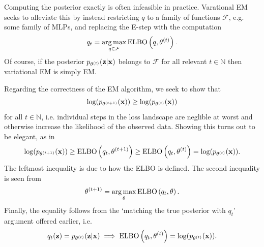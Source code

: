 \documentclass[11pt]{article}
\begin{document}
\begin{appendices}
\begin{tcolorbox}[title={\centering\textbf{Variational EM}}, colback=myLightBlue, colbacktitle=myDarkBlue, colframe=myDarkBlue, coltitle=white]
    Computing the posterior exactly is often infeasible in practice. Varational EM seeks to alleviate this by instead restricting $q$ to a family of functions $\mathcal{F}$, e.g. some family of MLPs, and replacing the E-step with the computation
    $$
    q_t
    =
    \operatorname*{arg\,max}_{q\in\mathcal{F}}\text{ELBO}\left(q,\theta^{(t)}\right).
    $$
    Of course, if the posterior $p_{\theta^{(t)}}(\mathbf{z}|\mathbf{x})$ belongs to $\mathcal{F}$ for all relevant $t\in\mathbb{N}$ then variational EM is simply EM.
\end{tcolorbox}
Regarding the correctness of the EM algorithm, we seek to show that
$$
\log(p_{\theta^{(t+1)}}(\mathbf{x}))
\geq
\log(p_{\theta^{(t)}}(\mathbf{x}))
$$
for all $t\in\mathbb{N}$, i.e. individual steps in the loss landscape are neglible at worst and otherwise increase the likelihood of the observed data. Showing this turns out to be elegant, as in
$$
\log(p_{\theta^{(t+1)}}(\mathbf{x}))
\geq
\text{ELBO}\left(q_t,\theta^{(t+1)}\right)
\geq
\text{ELBO}\left(q_t,\theta^{(t)}\right)
=
\log(p_{\theta^{(t)}}(\mathbf{x})).
$$
The leftmost inequality is due to how the ELBO is defined. The second inequality is seen from
$$
\theta^{(t+1)}
=
\operatorname*{arg\,max}_{\theta}\text{ELBO}\left(q_t,\theta\right).
$$
Finally, the equality follows from the `matching the true posterior with $q_t$' argument offered earlier, i.e.
$$
q_t(\mathbf{z})=p_{\theta^{(t)}}(\mathbf{z}|\mathbf{x})
\implies
\text{ELBO}\left(q_t,\theta^{(t)}\right)=\log(p_{\theta^{(t)}}(\mathbf{x})).
$$





\end{appendices}
\end{document}
